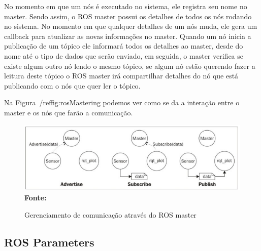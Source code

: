 No momento em que um nós é executado no sistema, ele registra seu nome no master. Sendo assim, o ROS master possui os detalhes de todos os nós rodando no sistema. No momento em que qualquer detalhes de um nós muda, ele gera um callback para atualizar as novas informações no master. Quando um nó inicia a publicação de um tópico ele informará todos os detalhes ao master, desde do nome até o tipo de dados que serão enviado, em seguida, o master verifica se existe algum outro nó lendo o mesmo tópico, se algum nó estão querendo fazer a leitura deste tópico o ROS master irá compartilhar detalhes do nó que está publicando com o nós que quer ler o tópico.

Na Figura~/ref{fig:rosMastering} podemos ver como se da a interação entre o master e os nós que farão a comunicação.


\begin{figure}[ht]
	\caption{Gerenciamento de comunicação através do ROS master}
	\begin{center}
		\includegraphics[scale=0.51]{imagens/rosmaster.png}\\
		{\small \textbf{Fonte:} }
    \end{center}\label{fig:rosMastering}
\end{figure}

\subsection{ROS Parameters}
















